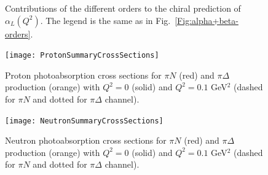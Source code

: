 \documentclass[11pt,preprint,tightenlines,
showpacs,preprintnumbers,amsmath,amssymb,superscriptaddress,a4paper,nofootinbib]{revtex4-1}
\begin{document}
\begin{figure}
\begin{center}
\hspace{0.5cm}  
\caption{Contributions of the different orders to the chiral prediction of $\alpha_{L}(Q^2)$. The legend is the same as in Fig.~\ref{Fig:alpha+beta-orders}. \label{Fig:alphaL-orders}}
\end{center}
\end{figure}




\begin{figure}
\begin{center} 
\texttt{[image: ProtonSummaryCrossSections]}
\caption{Proton photoabsorption cross sections for $\pi N$ (red) and $\pi \Delta$ production (orange) with $Q^2=0$ (solid) and $Q^2=0.1$ GeV$^2$ (dashed for $\pi N$ and dotted for $\pi \Delta$ channel). \label{Fig:ProtonSummaryCrossSections}}
\end{center}
\end{figure}

\begin{figure}
\begin{center} 
\texttt{[image: NeutronSummaryCrossSections]}
\caption{Neutron photoabsorption cross sections for $\pi N$ (red) and $\pi \Delta$ production (orange) with $Q^2=0$ (solid) and $Q^2=0.1$ GeV$^2$ (dashed for $\pi N$ and dotted for $\pi \Delta$ channel). \label{Fig:NeutronSummaryCrossSections}}
\end{center}
\end{figure}


\end{document}

